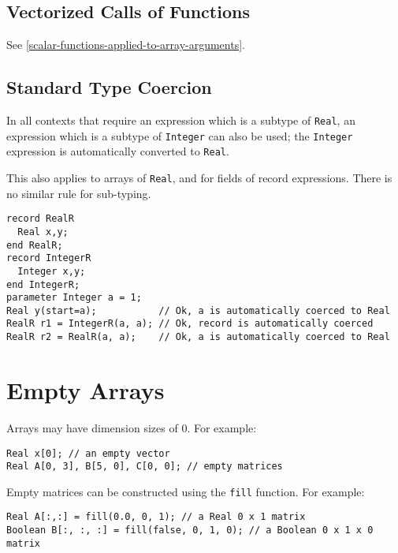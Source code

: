 \subsection{Vectorized Calls of Functions}\label{vectorized-calls-of-functions}

See \cref{scalar-functions-applied-to-array-arguments}.

\subsection{Standard Type Coercion}\label{standard-type-coercion}

In all contexts that require an expression which is a subtype of \lstinline!Real!, an expression which is a subtype of \lstinline!Integer! can also be used;
the \lstinline!Integer! expression is automatically converted to \lstinline!Real!.

This also applies to arrays of \lstinline!Real!, and for fields of record expressions.  There is no similar rule for sub-typing.

\begin{example}
\begin{lstlisting}[language=modelica]
record RealR
  Real x,y;
end RealR;
record IntegerR
  Integer x,y;
end IntegerR;
parameter Integer a = 1;
Real y(start=a);           // Ok, a is automatically coerced to Real
RealR r1 = IntegerR(a, a); // Ok, record is automatically coerced
RealR r2 = RealR(a, a);    // Ok, a is automatically coerced to Real
\end{lstlisting}
\end{example}

\section{Empty Arrays}\label{empty-arrays}

Arrays may have dimension sizes of 0.  For example:
\begin{lstlisting}[language=modelica]
Real x[0]; // an empty vector
Real A[0, 3], B[5, 0], C[0, 0]; // empty matrices
\end{lstlisting}

Empty matrices can be constructed using the \lstinline!fill! function.
For example:
\begin{lstlisting}[language=modelica]
Real A[:,:] = fill(0.0, 0, 1); // a Real 0 x 1 matrix
Boolean B[:, :, :] = fill(false, 0, 1, 0); // a Boolean 0 x 1 x 0 matrix
\end{lstlisting}

